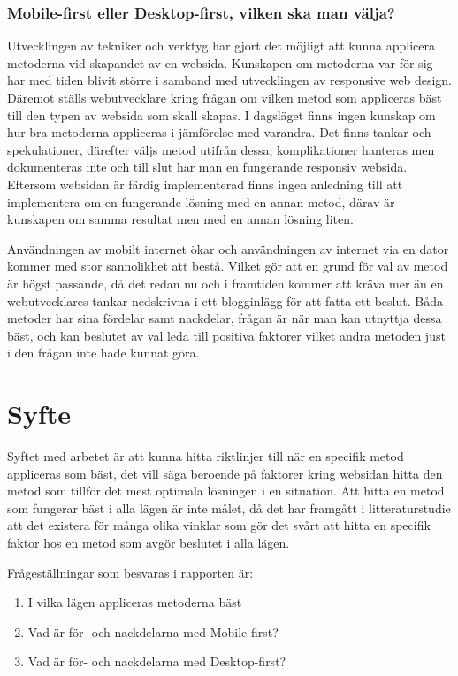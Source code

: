 \documentclass[11pt]{article}
\begin{document}
\subsubsection{Mobile-first eller Desktop-first, vilken ska man välja?}
Utvecklingen av tekniker och verktyg har gjort det möjligt att kunna applicera metoderna vid skapandet av en websida. Kunskapen om metoderna var för sig har med tiden blivit större i samband med utvecklingen av responsive web design. Däremot ställs webutvecklare kring frågan om vilken metod som appliceras bäst till den typen av websida som skall skapas. I dagsläget finns ingen kunskap om hur bra metoderna appliceras i jämförelse med varandra. Det finns tankar och spekulationer, därefter väljs metod utifrån dessa, komplikationer hanteras men dokumenteras inte och till slut har man en fungerande responsiv websida. Eftersom websidan är färdig implementerad finns ingen anledning till att implementera om en fungerande lösning med en annan metod, därav är kunskapen om samma resultat men med en annan lösning liten.

Användningen av mobilt internet ökar och användningen av internet via en dator kommer med stor sannolikhet att bestå. Vilket gör att en grund för val av metod är högst passande, då det redan nu och i framtiden kommer att kräva mer än en webutvecklares tankar nedskrivna i ett blogginlägg för att fatta ett beslut. Båda metoder har sina fördelar samt nackdelar, frågan är när man kan utnyttja dessa bäst, och kan beslutet av val leda till positiva faktorer vilket andra metoden just i den frågan inte hade kunnat göra.    
\newpage

\section{Syfte}
Syftet med arbetet är att kunna hitta riktlinjer till när en specifik metod appliceras som bäst, det vill säga beroende på faktorer kring websidan hitta den metod som tillför det mest optimala lösningen i en situation. Att hitta en metod som fungerar bäst i alla lägen är inte målet, då det har framgått i litteraturstudie att det existera för många olika vinklar som gör det svårt att hitta en specifik faktor hos en metod som avgör beslutet i alla lägen.

Frågeställningar som besvaras i rapporten är:

\begin{enumerate}
	\item I vilka lägen appliceras metoderna bäst
	\item Vad är för- och nackdelarna med Mobile-first?
	\item Vad är för- och nackdelarna med Desktop-first?
\end{enumerate}
\end{document}
